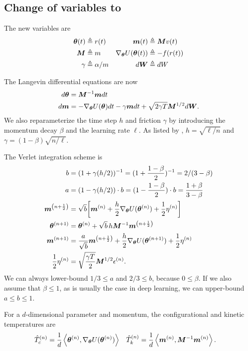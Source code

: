 \documentclass{article}
\begin{document}
\subsection{Change of variables to \citet{wenzel20posterior}}
{
  \newcommand{\gradat}[1]{{\nabla_\vtheta U(\vtheta\ssup{#1})}}
\label{sec:org3c9a23e}
The new variables are
\begin{align*}
{\boldsymbol\theta}(t) &\triangleq r(t) & {\bm{m}}(t) &\triangleq {\bm{M}} v(t) \\
{\bm{M}} &\triangleq m &   \nabla_{\boldsymbol\theta} U({\boldsymbol\theta}(t)) &\triangleq -f(r(t)) \\
\gamma &\triangleq \alpha / m & d{\bm{W}} &\triangleq dW \\ 
\end{align*}

The Langevin differential equations are now
\begin{align}
  d{\boldsymbol\theta} &= {\bm{M}}^{-1} {\bm{m}} dt \\
  d{\bm{m}} &= - \nabla_{\boldsymbol\theta} U({\boldsymbol\theta})dt -\gamma {\bm{m}} dt  + \sqrt{2\gamma T}{\bm{M}}^{1/2} d{\bm{W}}.
\end{align}
We also reparameterize the time step $h$ and friction $\gamma$ by introducing
the momentum decay $\beta$ and the learning rate $\ell$. As listed by
\citet{wenzel20posterior}, $h = \sqrt{\ell / n}$ and $\gamma = (1 - \beta)\sqrt{n / \ell}$.

The Verlet integration scheme is
\begin{align}
b &= (1 + \gamma (h/2))^{-1} = (1 + \frac{1 - \beta}{2})^{-1} = 2/(3 - \beta)\\
a &= (1 - \gamma (h/2)) \cdot b = (1 - \frac{1 - \beta}{2}) \cdot b = \frac{1+\beta}{3-\beta}\\
\vm\ssup{n+\frac{1}{2}} &= \sqrt{b} \sqb{\vm\ssup{n} + \frac{h}{2}\gradat{n}  + \frac{1}{2}\eta\ssup{n}} \\
\vtheta\ssup{n+1} &= \vtheta\ssup{n}+ \sqrt{b}\, h \vM^{-1} \vm\ssup{n+\frac{1}{2}}\\
\vm\ssup{n+1} &= \frac{a}{\sqrt{b}}\vm\ssup{n+\frac{1}{2}} + \frac{h}{2}\gradat{n+1} + \frac{1}{2}\eta\ssup{n}\\
  \frac{1}{2}\eta\ssup{n} &= \sqrt{\frac{\gamma T}{2}}\vM^{1/2}\epsilon\ssup{n}.\\
\end{align}
We can always lower-bound $1/3 \le a$ and $2/3 \le b$, because $0 \le \beta$.
If we also assume that $\beta \le 1$, as is usually the case in deep learning, we can
upper-bound $a \le b \le 1$.

For a $d$-dimensional parameter and momentum, the configurational and kinetic temperatures are
\begin{align}
  \hat{T}_c\ssup{n} &= \frac{1}{d}\left\langle\vtheta\ssup{n}, \gradat{n}\right\rangle & \hat{T}_k\ssup{n} &= \frac{1}{d} \left\langle \vm\ssup{n}, \vM^{-1}\vm\ssup{n} \right\rangle.
\end{align}
}
\end{document}
